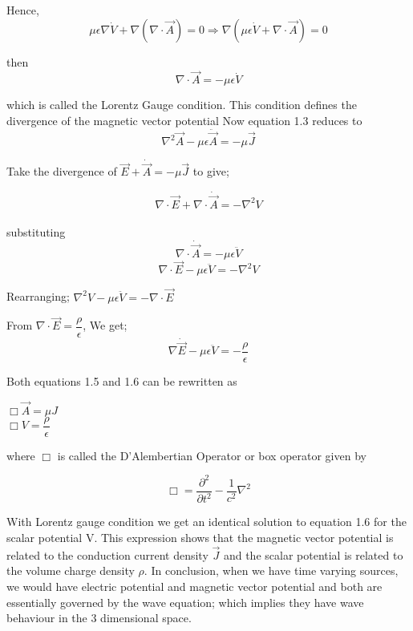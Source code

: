 Hence, \begin{equation}
\mu\epsilon\nabla\dot{V}+\nabla(\nabla\cdot\vec{A})=0 \Rightarrow \nabla(\mu\epsilon\dot{V}+\nabla\cdot\vec{A})=0
\end{equation}

then
$$\nabla\cdot\vec{A}=-\mu\epsilon\dot{V}$$

which is called the Lorentz Gauge condition.
This condition defines the divergence of the magnetic vector potential
Now equation 1.3 reduces to
\begin{equation}
\nabla^{2}\vec{A}-\mu\epsilon\ddot{\vec{A}}=-\mu\vec{J}
\end{equation} 


Take the divergence of $\vec{E}+\dot{\vec{A}}=-\mu\vec{J}$ to give;

$$\nabla\cdot\vec{E}+\nabla\cdot\dot{\vec{A}}=-\nabla^{2} V$$\\
substituting	
$$\nabla\cdotp\dot{\vec{A}}=-\mu\epsilon\ddot{V}$$
$$\nabla\cdotp\vec{E}-\mu\epsilon\ddot{V}=-\nabla^{2} V$$

Rearranging; $\nabla^{2} V-\mu\epsilon\ddot{V}=-\nabla\cdotp\vec{E}$

From $\nabla\cdotp\vec{E}=\dfrac{\rho}{\epsilon}$, We get;
\begin{equation}
\nabla\dot\vec{E}-\mu\epsilon\ddot{V}=-\dfrac{\rho}{\epsilon}
\end{equation}

Both equations 1.5 and 1.6 can be rewritten as
\begin{center}
	$\Box\vec{A}=\mu J$\\
	$\Box V=\dfrac{\rho}{\epsilon}$\\
\end{center}
where $\Box$ is called the D'Alembertian Operator or box operator given by 

$$\Box=\dfrac{\partial^{2}}{\partial t^{2}}-\dfrac{1}{c^{2}}\nabla^{2}$$

With Lorentz gauge condition we get an identical solution to equation 1.6 for the scalar potential V. This expression shows that the magnetic vector potential is related to the conduction current density $\vec{J}$ and the scalar potential is related to the volume charge density $\rho$. In conclusion, when we have time varying sources, we would have electric potential and magnetic vector potential and both are essentially governed by the wave equation; which implies they have wave behaviour in the 3 dimensional space.